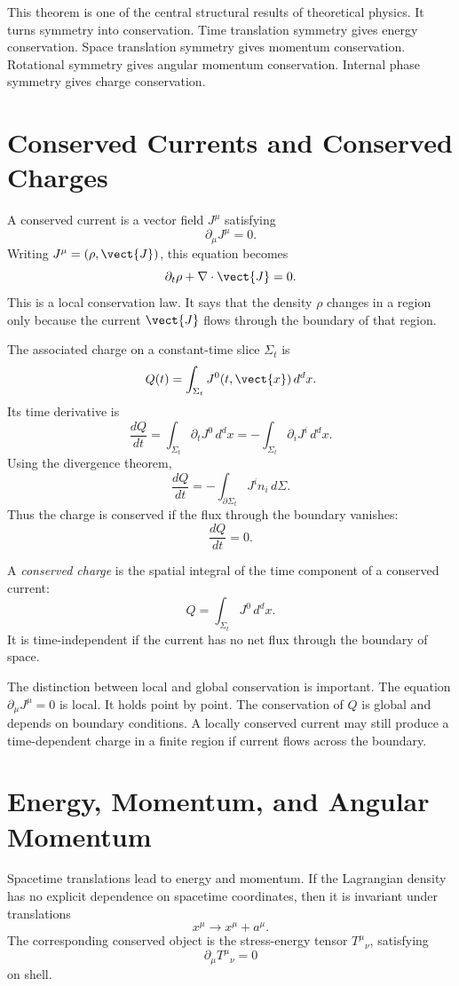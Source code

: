 This theorem is one of the central structural results of theoretical physics.
It turns symmetry into conservation. Time translation symmetry gives energy
conservation. Space translation symmetry gives momentum conservation. Rotational
symmetry gives angular momentum conservation. Internal phase symmetry gives
charge conservation.

\section{Conserved Currents and Conserved Charges}

A conserved current is a vector field \(J^\mu\) satisfying
\[
    \partial_\mu J^\mu=0.
\]
Writing \(J^\mu=(\rho,\vect{J})\), this equation becomes
\[
    \partial_t\rho+\nabla\cdot\vect{J}=0.
\]
This is a local conservation law. It says that the density \(\rho\) changes in a
region only because the current \(\vect{J}\) flows through the boundary of that
region.

The associated charge on a constant-time slice \(\Sigma_t\) is
\[
    Q(t)=\int_{\Sigma_t}J^0(t,\vect{x})\,d^d x.
\]
Its time derivative is
\[
    \frac{dQ}{dt}=\int_{\Sigma_t}\partial_tJ^0\,d^d x
    =-\int_{\Sigma_t}\partial_iJ^i\,d^d x.
\]
Using the divergence theorem,
\[
    \frac{dQ}{dt}=-\int_{\partial\Sigma_t}J^i n_i\,d\Sigma.
\]
Thus the charge is conserved if the flux through the boundary vanishes:
\[
    \frac{dQ}{dt}=0.
\]

\begin{definitionbox}
A \emph{conserved charge} is the spatial integral of the time component of a
conserved current:
\[
    Q=\int_{\Sigma_t}J^0\,d^d x.
\]
It is time-independent if the current has no net flux through the boundary of
space.
\end{definitionbox}

The distinction between local and global conservation is important. The
equation \(\partial_\mu J^\mu=0\) is local. It holds point by point. The
conservation of \(Q\) is global and depends on boundary conditions. A locally
conserved current may still produce a time-dependent charge in a finite region
if current flows across the boundary.

\section{Energy, Momentum, and Angular Momentum}

Spacetime translations lead to energy and momentum. If the Lagrangian density
has no explicit dependence on spacetime coordinates, then it is invariant under
translations
\[
    x^\mu\longrightarrow x^\mu+a^\mu.
\]
The corresponding conserved object is the stress-energy tensor
\(T^\mu{}_{\nu}\), satisfying
\[
    \partial_\mu T^\mu{}_{\nu}=0
\]
on shell.

